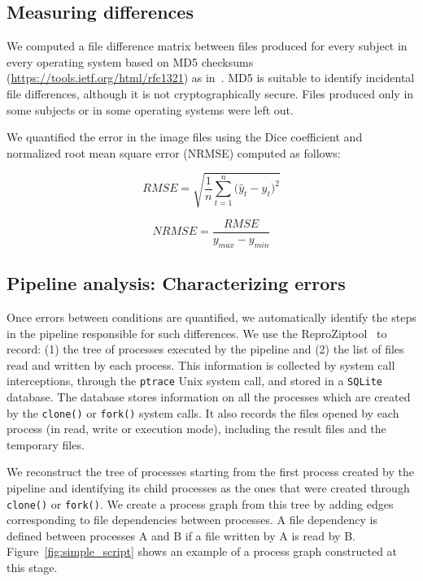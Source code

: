 \documentclass{article}
\newcommand{\reprozip}[0]{ReproZip}
\begin{document}
\subsection{Measuring differences}



We computed a file difference matrix between files produced for every
subject in every operating system based on MD5 checksums~\cite{md5}
(\url{https://tools.ietf.org/html/rfc1321}) as
in~\cite{Scaria2017}. MD5 is suitable to identify incidental file
differences, although it is not cryptographically secure. Files
produced only in some subjects or in some operating systems were left out.

We quantified the error in the image files using the Dice coefficient and normalized root mean square error (NRMSE) computed as follows:
\begin{center}
\begin{equation}
RMSE = {\sqrt {\frac{1} {n}{\sum\limits_{t = 1}^n {(\hat{y}_{t} - {y}_{t} } })^{2} } }
\end{equation}
\end{center}

\begin{center}
\begin{equation}
NRMSE = {\frac{RMSE} {y_{max} - y_{min}}}
\end{equation}
\end{center}

\subsection{Pipeline analysis: Characterizing errors}

Once errors between conditions are quantified, we automatically
identify the steps in the pipeline responsible for such differences.
We use the \reprozip tool~\cite{reprozip} to record: (1) the tree of
processes executed by the pipeline and (2) the list of files read and
written by each process. This information is collected by system call
interceptions, through the \texttt{ptrace} Unix system call, and
stored in a \texttt{SQLite} database. The database stores information
on all the processes which are created by the \texttt{clone()} or
\texttt{fork()} system calls. It also records the files opened by each
process (in read, write or execution mode), including the result files
and the temporary files.

We reconstruct the tree of processes starting from the first process
created by the pipeline and identifying its child processes as the ones
that were created through \texttt{clone()} or \texttt{fork()}. We
create a process graph from this tree by adding edges corresponding to
file dependencies between processes. A file dependency is defined
between processes A and B if a file written by A is read by
B. Figure~\ref{fig:simple_script} shows an example of a process graph
constructed at this stage.
\end{document}

